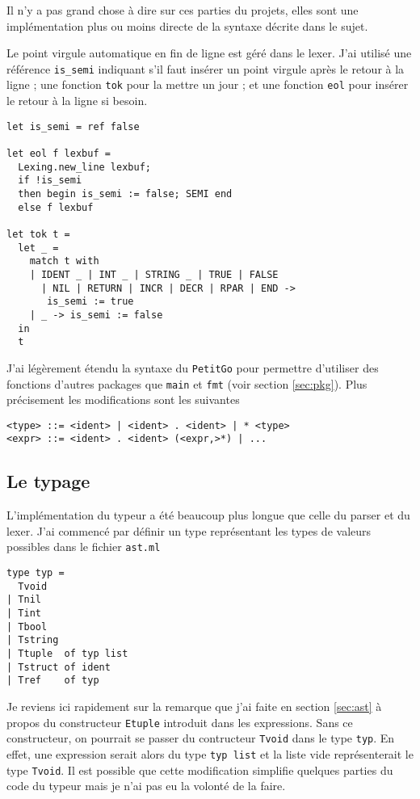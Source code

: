 \documentclass{article}
\begin{document}
Il n'y a pas grand chose à dire sur ces parties du projets, elles sont une implémentation plus ou moins directe de la syntaxe décrite dans le sujet.

Le point virgule automatique en fin de ligne est géré dans le lexer. J'ai utilisé une référence \texttt{is\_semi} indiquant s'il faut insérer un point virgule après le retour à la ligne ; une fonction \texttt{tok} pour la mettre un jour ; et une fonction \texttt{eol} pour insérer le retour à la ligne si besoin.

\begin{verbatim}
let is_semi = ref false

let eol f lexbuf =
  Lexing.new_line lexbuf;
  if !is_semi
  then begin is_semi := false; SEMI end
  else f lexbuf

let tok t =
  let _ =
    match t with
    | IDENT _ | INT _ | STRING _ | TRUE | FALSE
      | NIL | RETURN | INCR | DECR | RPAR | END ->
       is_semi := true
    | _ -> is_semi := false
  in
  t

\end{verbatim}

J'ai légèrement étendu la syntaxe du \texttt{PetitGo} pour permettre d'utiliser des fonctions d'autres packages que \texttt{main} et \texttt{fmt} (voir section \ref{sec:pkg}). Plus précisement les modifications sont les suivantes

\begin{verbatim}
<type> ::= <ident> | <ident> . <ident> | * <type>
<expr> ::= <ident> . <ident> (<expr,>*) | ...
\end{verbatim}

\subsection{Le typage}

L'implémentation du typeur a été beaucoup plus longue que celle du parser et du lexer. J'ai commencé par définir un type représentant les types de valeurs possibles dans le fichier \texttt{ast.ml}

\begin{verbatim}
type typ =
  Tvoid
| Tnil
| Tint
| Tbool
| Tstring
| Ttuple  of typ list
| Tstruct of ident
| Tref    of typ
\end{verbatim}

Je reviens ici rapidement sur la remarque que j'ai faite en section \ref{sec:ast} à propos du constructeur \texttt{Etuple} introduit dans les expressions. Sans ce constructeur, on pourrait se passer du contructeur \texttt{Tvoid} dans le type \texttt{typ}. En effet, une expression serait alors du type \texttt{typ list} et la liste vide représenterait le type \texttt{Tvoid}. Il est possible que cette modification simplifie quelques parties du code du typeur mais je n'ai pas eu la volonté de la faire.
\end{document}
